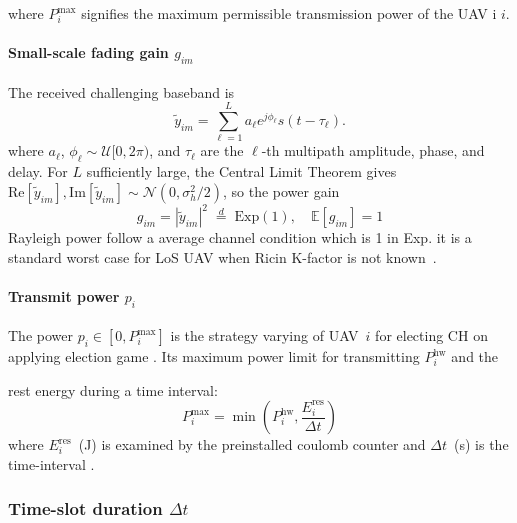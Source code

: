 \documentclass[journal]{IEEEtran}
\begin{document}
where $P_i^{\max}$ signifies the maximum permissible transmission power of the UAV i $i$.

\paragraph{Small-scale fading gain $g_{im}$}
The received challenging baseband  is
\begin{equation}
\label{eq:baseband}
  \tilde{y}_{im}=\sum_{\ell=1}^{L}a_{\ell}e^{j\phi_{\ell}}
                 s(t-\tau_{\ell}).
\end{equation}
where $a_{\ell}$, $\phi_{\ell}\sim\mathcal{U}[0,2\pi)$,
and $\tau_{\ell}$ are the $\ell$-th multipath amplitude,
phase, and delay.  For $L$ sufficiently large, the
Central Limit Theorem gives
$\mathrm{Re}[\tilde{y}_{im}],\mathrm{Im}[\tilde{y}_{im}]
\sim\mathcal{N}(0,\sigma_{h}^{2}/2)$, so the power gain
\begin{equation}\label{eq:fading}
  g_{im}=|\tilde{y}_{im}|^{2}
  \;\overset{d}{=}\;\mathrm{Exp}(1),
  \quad\mathbb{E}[g_{im}]=1
\end{equation}
Rayleigh power follow a average channel condition which is 1 in Exp.
it is a standard worst case for LoS UAV when Ricin K-factor
is not known~\cite{ref8}.
\paragraph{Transmit power $p_{i}$}
The power $p_{i}\in[0,P_{i}^{\max}]$ is the strategy varying of UAV~$i$ for electing CH on applying election game
.  Its maximum power limit for transmitting $P_{i}^{\mathrm{hw}}$ and the

 rest energy during a time interval:
\begin{equation}\label{eq:pmax}
  P_{i}^{\max}=\min\!\left(P_{i}^{\mathrm{hw}},
  \frac{E_{i}^{\mathrm{res}}}{\Delta t}\right)
\end{equation}
where $E_{i}^{\mathrm{res}}$~(J) is examined  by the
preinstalled coulomb counter and $\Delta t$~(s) is the
time-interval .
\subsubsection{Time-slot duration $\Delta t$}\label{sec:delta_t}
\end{document}
